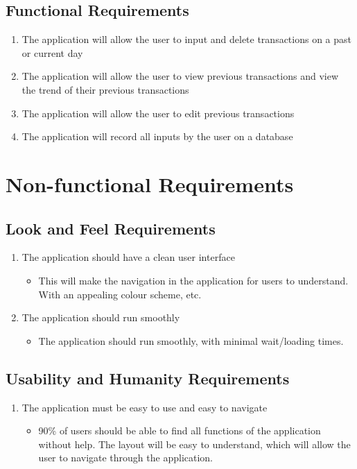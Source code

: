 \documentclass[12pt, titlepage]{article}
\begin{document}
\subsection{Functional Requirements}
   \begin{enumerate}
     \item The application will allow the user to input and delete transactions on a past or current day %
     \item The application will allow the user to view previous transactions and view the trend of their previous transactions %
     \item  The application will allow the user to edit previous transactions
     \item The application will record all inputs by the user on a database %
   \end{enumerate}

\section{Non-functional Requirements}

\subsection{Look and Feel Requirements}
   \begin{enumerate}
   \item The application should have a clean user interface %
   \begin{itemize}
     \item This will make the navigation in the application for users to understand. With an appealing colour scheme, etc.
   \end{itemize}

   \item The application should run smoothly
   \begin{itemize}
     \item The application should run smoothly, with minimal wait/loading times. %
   \end{itemize}
\end{enumerate}
\subsection{Usability and Humanity Requirements}
   \begin{enumerate}
   \item The application must be easy to use and easy to navigate
   \begin{itemize}
     \item 90\% of users should be able to find all functions of the application without help. The layout will be easy to understand, which will allow the user to navigate through the application. %
   \end{itemize}
 \end{enumerate}
\end{document}
